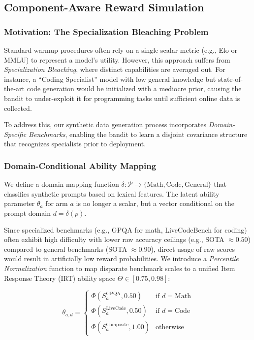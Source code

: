 \subsection{Component-Aware Reward Simulation}
\label{sec:component_aware_warmup}

\subsubsection{Motivation: The Specialization Bleaching Problem}
Standard warmup procedures often rely on a single scalar metric (e.g., Elo or MMLU) to represent a model's utility. However, this approach suffers from \textit{Specialization Bleaching}, where distinct capabilities are averaged out. For instance, a ``Coding Specialist'' model with low general knowledge but state-of-the-art code generation would be initialized with a mediocre prior, causing the bandit to under-exploit it for programming tasks until sufficient online data is collected.

To address this, our synthetic data generation process incorporates \textit{Domain-Specific Benchmarks}, enabling the bandit to learn a disjoint covariance structure that recognizes specialists prior to deployment.

\subsubsection{Domain-Conditional Ability Mapping}
We define a domain mapping function $\delta: \mathcal{P} \to \{\text{Math}, \text{Code}, \text{General}\}$ that classifies synthetic prompts based on lexical features. The latent ability parameter $\theta_{a}$ for arm $a$ is no longer a scalar, but a vector conditional on the prompt domain $d = \delta(p)$.

Since specialized benchmarks (e.g., GPQA for math, LiveCodeBench for coding) often exhibit high difficulty with lower raw accuracy ceilings (e.g., SOTA $\approx 0.50$) compared to general benchmarks (SOTA $\approx 0.90$), direct usage of raw scores would result in artificially low reward probabilities. We introduce a \textit{Percentile Normalization} function to map disparate benchmark scales to a unified Item Response Theory (IRT) ability space $\Theta \in [0.75, 0.98]$:

\begin{equation}
    \theta_{a,d} = 
    \begin{cases} 
        \Phi(S_{a}^{\text{GPQA}}, 0.50) & \text{if } d = \text{Math} \\
        \Phi(S_{a}^{\text{LiveCode}}, 0.50) & \text{if } d = \text{Code} \\
        \Phi(S_{a}^{\text{Composite}}, 1.00) & \text{otherwise}
    \end{cases}
\end{equation}

